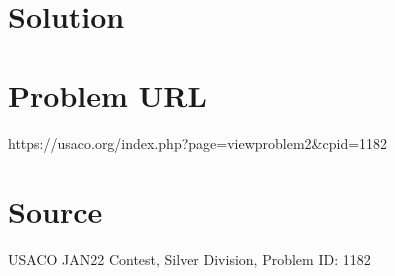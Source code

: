\documentclass[12pt]{article}
\begin{document}
\section*{Solution}


\section*{Problem URL}
https://usaco.org/index.php?page=viewproblem2&cpid=1182

\section*{Source}
USACO JAN22 Contest, Silver Division, Problem ID: 1182
\end{document}
